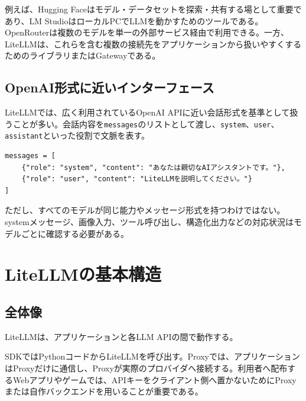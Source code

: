 \documentclass[a4paper,11pt]{jsarticle}
\begin{document}
例えば、Hugging Faceはモデル・データセットを探索・共有する場として重要であり、LM StudioはローカルPCでLLMを動かすためのツールである。OpenRouterは複数のモデルを単一の外部サービス経由で利用できる。一方、LiteLLMは、これらを含む複数の接続先をアプリケーションから扱いやすくするためのライブラリまたはGatewayである。

\subsection{OpenAI形式に近いインターフェース}

LiteLLMでは、広く利用されているOpenAI APIに近い会話形式を基準として扱うことが多い。会話内容を\texttt{messages}のリストとして渡し、\texttt{system}、\texttt{user}、\texttt{assistant}といった役割で文脈を表す。

\begin{lstlisting}[caption={会話メッセージの基本形}]
messages = [
    {"role": "system", "content": "あなたは親切なAIアシスタントです。"},
    {"role": "user", "content": "LiteLLMを説明してください。"}
]
\end{lstlisting}

ただし、すべてのモデルが同じ能力やメッセージ形式を持つわけではない。systemメッセージ、画像入力、ツール呼び出し、構造化出力などの対応状況はモデルごとに確認する必要がある。

\section{LiteLLMの基本構造}

\subsection{全体像}

LiteLLMは、アプリケーションと各LLM APIの間で動作する。

\begin{center}
\end{center}

SDKではPythonコードからLiteLLMを呼び出す。Proxyでは、アプリケーションはProxyだけに通信し、Proxyが実際のプロバイダへ接続する。利用者へ配布するWebアプリやゲームでは、APIキーをクライアント側へ置かないためにProxyまたは自作バックエンドを用いることが重要である。
\end{document}
